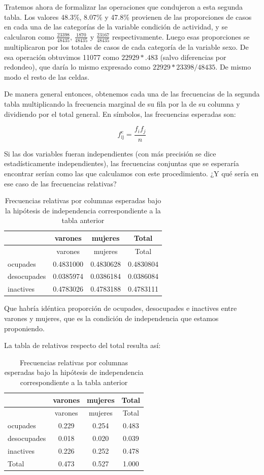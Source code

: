 \documentclass[]{book}
\begin{document}
Tratemos ahora de formalizar las operaciones que condujeron a esta segunda tabla. Los valores 48.3\%, 8.07\% y 47.8\% provienen de las proporciones de casos en cada una de las categorías de la variable condición de actividad, y se calcularon como \(\frac{23398}{48435}\), \(\frac{1870}{48435}\) y \(\frac{23167}{48435}\) respectivamente. Luego esas proporciones se multiplicaron por los totales de casos de cada categoría de la variable sexo. De esa operación obtuvimos 11077 como \(22929*.483\) (salvo diferencias por redondeo), que daría lo mismo expresado como \(22929*23398/48435\). De mismo modo el resto de las celdas.

De manera general entonces, obtenemos cada una de las frecuencias de la segunda tabla multiplicando la frecuencia marginal de su fila por la de su columna y dividiendo por el total general. En símbolos, las
frecuencias esperadas son:

\[f_{\text{ij}}^{e} = \frac{f_{i}f_{j}}{n}\]

Si las dos variables fueran independientes (con más precisión se dice
estadísticamente independientes), las frecuencias conjuntas que se
esperaría encontrar serían como las que calculamos con este
procedimiento. ¿Y qué sería en ese caso de las frecuencias relativas?

\begin{longtable}[]{@{}lccc@{}}
\caption{\label{tab:unnamed-chunk-144}Frecuencias relativas por columnas esperadas bajo la hipótesis de independencia correspondiente a la tabla anterior}\tabularnewline
\toprule
& varones & mujeres & Total\tabularnewline
\midrule
\endfirsthead
\toprule
& varones & mujeres & Total\tabularnewline
\midrule
\endhead
ocupades & 0.4831000 & 0.4830628 & 0.4830804\tabularnewline
desocupades & 0.0385974 & 0.0386184 & 0.0386084\tabularnewline
inactives & 0.4783026 & 0.4783188 & 0.4783111\tabularnewline
\bottomrule
\end{longtable}

Que habría idéntica proporción de ocupades, desocupades e inactives entre varones y mujeres, que es la condición de independencia que estamos proponiendo.

La tabla de relativos respecto del total resulta así:

\begin{longtable}[]{@{}lccc@{}}
\caption{\label{tab:unnamed-chunk-145}Frecuencias relativas por columnas esperadas bajo la hipótesis de independencia correspondiente a la tabla anterior}\tabularnewline
\toprule
& varones & mujeres & Total\tabularnewline
\midrule
\endfirsthead
\toprule
& varones & mujeres & Total\tabularnewline
\midrule
\endhead
ocupades & 0.229 & 0.254 & 0.483\tabularnewline
desocupades & 0.018 & 0.020 & 0.039\tabularnewline
inactives & 0.226 & 0.252 & 0.478\tabularnewline
Total & 0.473 & 0.527 & 1.000\tabularnewline
\bottomrule
\end{longtable}
\end{document}
